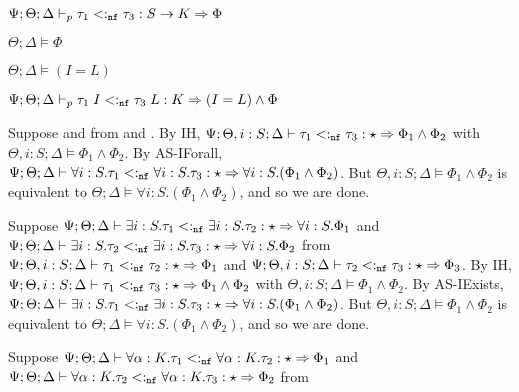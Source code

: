 {{    
    
     $\Psi ; \Theta ; \Delta \vdash_p \tau_1 <:_{\texttt{nf}} \tau_3 : S \to K \Rightarrow \Phi$
    
     $\Theta ; \Delta \vDash \Phi$
    
    
     $\Theta ; \Delta \vDash (I = L)$
    
    
     $\Psi ; \Theta ; \Delta \vdash_p \tau_1 \; I <:_{\texttt{nf}} \tau_3 \; L : K \Rightarrow (I = L) \wedge \Phi$
    
  }
}

\iffalse

  \item[(AS-IForall)] Suppose  and
   from  and . By IH, $\Psi ; \Theta, i : S ; \Delta \vdash \tau_1 <:_{\texttt{nf}} \tau_3 : \star \Rightarrow \Phi_1 \wedge \Phi_2$ with $\Theta, i: S ; \Delta \vDash \Phi_1 \wedge \Phi_2$. By AS-IForall, $\Psi ; \Theta ; \Delta \vdash \forall i : S. \tau_1 <:_{\texttt{nf}} \forall i : S.\tau_3 : \star \Rightarrow \forall i : S.(\Phi_1 \wedge \Phi_2)$. But $\Theta, i : S ; \Delta \vDash \Phi_1 \wedge \Phi_2$ is equivalent to $\Theta ; \Delta \vDash \forall i : S. (\Phi_1 \wedge \Phi_2)$, and so we are done.
  \item[(AS-IExists)]  Suppose $\Psi ; \Theta ; \Delta \vdash \exists i : S. \tau_1 <:_{\texttt{nf}} \exists i : S. \tau_2 : \star \Rightarrow \forall i : S. \Phi_1$ and
  $\Psi ; \Theta ; \Delta \vdash \exists i : S. \tau_2 <:_{\texttt{nf}} \exists i : S. \tau_3 : \star \Rightarrow \forall i : S. \Phi_2$ from $\Psi ; \Theta, i : S ; \Delta \vdash \tau_1 <:_{\texttt{nf}} \tau_2 : \star \Rightarrow \Phi_1$ and $\Psi ; \Theta, i : S ; \Delta \vdash \tau_2 <:_{\texttt{nf}} \tau_3 : \star \Rightarrow \Phi_3$. By IH, $\Psi ; \Theta, i : S ; \Delta \vdash \tau_1 <:_{\texttt{nf}} \tau_3 : \star \Rightarrow \Phi_1 \wedge \Phi_2$ with $\Theta, i: S ; \Delta \vDash \Phi_1 \wedge \Phi_2$. By AS-IExists, $\Psi ; \Theta ; \Delta \vdash \exists i : S. \tau_1 <:_{\texttt{nf}} \exists i : S.\tau_3 : \star \Rightarrow \forall i : S.(\Phi_1 \wedge \Phi_2)$. But $\Theta, i : S ; \Delta \vDash \Phi_1 \wedge \Phi_2$ is equivalent to $\Theta ; \Delta \vDash \forall i : S. (\Phi_1 \wedge \Phi_2)$, and so we are done.
  \item[(AS-TForall)] Suppose $\Psi ; \Theta ; \Delta \vdash \forall \alpha : K. \tau_1 <:_{\texttt{nf}} \forall \alpha : K. \tau_2 : \star \Rightarrow \Phi_1$ and
  $\Psi ; \Theta ; \Delta \vdash \forall \alpha : K. \tau_2 <:_{\texttt{nf}} \forall \alpha : K. \tau_3 : \star \Rightarrow \Phi_2$ from
